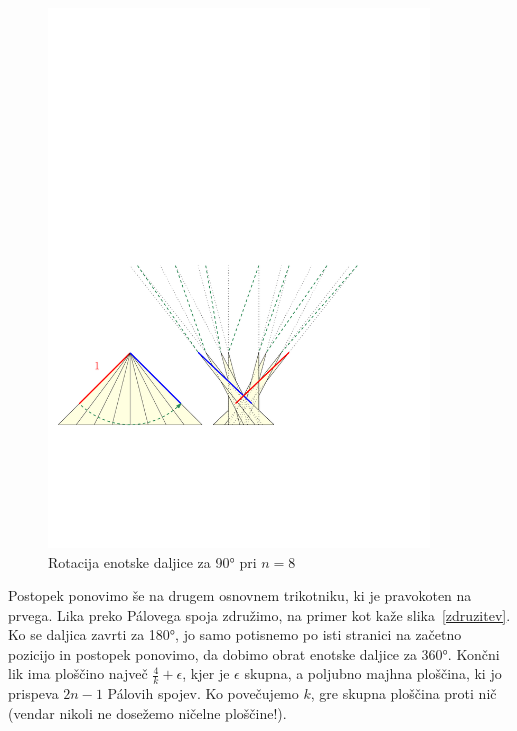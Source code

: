 \documentclass[a4paper, 12pt]{article}
\begin{document}
\begin{figure}[h!]
    \centering
    \includegraphics[width=0.9\textwidth]{ipe_slike/prehod_drevo1.pdf}
    \caption{Rotacija enotske daljice za 90° pri $ n = 8 $}
    \label{prehodi}
\end{figure}

Postopek ponovimo še na drugem osnovnem trikotniku, ki je pravokoten na prvega. Lika preko Pálovega spoja združimo, na primer kot kaže slika~\ref{zdruzitev}. Ko se daljica zavrti za 180°, jo samo potisnemo po isti stranici na začetno pozicijo in postopek ponovimo, da dobimo obrat enotske daljice za 360°. Končni lik ima ploščino največ $ \frac{4}{k} + \epsilon $, kjer je $ \epsilon $ skupna, a poljubno majhna ploščina, ki jo prispeva $ 2n - 1 $ Pálovih spojev. Ko povečujemo $ k $, gre skupna ploščina proti nič (vendar nikoli ne dosežemo ničelne ploščine!).
\end{document}
